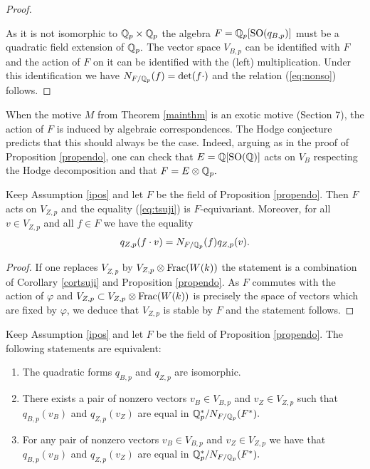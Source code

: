 \documentclass[11pt]{amsart}
\begin{document}
\begin{proof}
\

As it is not isomorphic to $\mathbb{Q}_p \times \mathbb{Q}_p$ the algebra $F=\mathbb{Q}_p[\textnormal{SO}(q_{B,p})]$ must be a quadratic field extension of $\mathbb{Q}_p.$ The vector space $V_{B,p}$ can be identified with $F$ and the action of $F$ on it can be identified with the (left) multiplication. Under this identification we have $N_{F/\mathbb{Q}_p}(f)= \det(f \cdot)$ and the relation  (\ref{eq:nonso})   follows.
\end{proof}
\begin{remark}
When the motive $M$ from Theorem \ref{mainthm} is  an exotic motive (Section 7), the action of $F$ is induced by algebraic correspondences. The Hodge conjecture predicts that this should always be the case. Indeed, arguing as in the proof of Proposition \ref{propendo}, one can check that $E=\mathbb{Q}[\textnormal{SO}(\mathbb{Q})]$ acts on $V_B$ respecting the Hodge decomposition and that $F=E \otimes \mathbb{Q}_p.$
\end{remark}
\begin{corollary}\label{nonso}
Keep Assumption  \ref{ipos} and let $F$ be the field of  Proposition \ref{propendo}. Then $F$ acts on $V_{Z,p}$ and the equality  (\ref{eq:tsuji}) is $F$-equivariant. Moreover,  for all $v\in V_{Z,p} $ and all $f\in F$  we have the equality
\begin{equation} \label{eq:nonso2}
q_{Z,p}(f \cdot v)=N_{F/\mathbb{Q}_p}(f) q_{Z,p}(v).
\end{equation}
\end{corollary}
\begin{proof}
If one replaces $V_{Z,p}$ by $V_{Z,p}\otimes \mathrm{Frac}(W(k))$ the statement is a combination of  Corollary \ref{cortsuji}   and Proposition \ref{propendo}. As $F$ commutes with the action of $\varphi$ and $V_{Z,p} \subset V_{Z,p}\otimes \mathrm{Frac}(W(k))$ is precisely the space of vectors which are fixed by $\varphi$, we deduce that $V_{Z,p}$ is stable by $F$ and the statement follows.
\end{proof}
\begin{corollary}\label{norms}
Keep Assumption  \ref{ipos} and let $F$ be the field of  Proposition \ref{propendo}. The following statements are equivalent:
\begin{enumerate}
\item The quadratic forms $q_{B,p}$ and $q_{Z,p}$ are isomorphic.
\item There exists a pair of nonzero vectors  $v_B\in V_{B,p}$ and $v_Z\in V_{Z,p}$ such that $q_{B,p}(v_B)$ and $q_{Z,p}(v_Z)$ are equal in $\mathbb{Q}_p^*/N_{F/\mathbb{Q}_p}(F^*).$
\item For any  pair of nonzero vectors  $v_B\in V_{B,p}$ and $v_Z\in V_{Z,p}$ we have that $q_{B,p}(v_B)$ and $q_{Z,p}(v_Z)$ are equal in $\mathbb{Q}_p^*/N_{F/\mathbb{Q}_p}(F^*).$
\end{enumerate}
\end{corollary}
\end{document}
